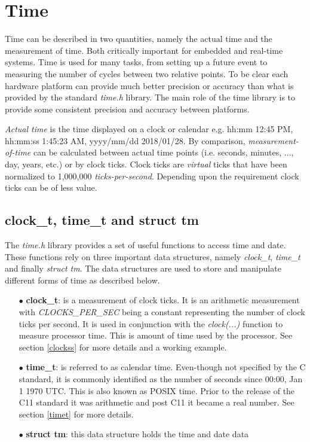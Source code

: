 \section{Time} \label{Time}

Time can be described in two quantities, namely the actual time and the measurement of time. Both critically important for embedded and real-time systems. Time is used for many tasks, from setting up a future event to measuring the number of cycles between two relative points. To be clear each hardware platform can provide much better precision or accuracy than what is provided by the standard \textit{time.h} library. The main role of the time library is to provide some consistent precision and accuracy between platforms.  

\textit{Actual time} is the time displayed on a clock or calendar e.g. hh:mm 12:45 PM, hh:mm:ss 1:45:23 AM, yyyy/mm/dd 2018/01/28. By comparison, \textit{measurement-of-time} can be calculated between actual time points (i.e. seconds, minutes, ..., day, years, etc.) or by clock ticks. Clock ticks are \textit{virtual} ticks that have been normalized to 1,000,000 \textit{ticks-per-second}. Depending upon the requirement clock ticks can be of less value. 

\subsection{clock\_t, time\_t and struct tm}

The \textit{time.h} library provides a set of useful functions to access time and date. These functions rely on three important data structures, namely \textit{clock\_t}, \textit{time\_t} and finally \textit{struct tm}. The data structures are used to store and manipulate different forms of time as described below.

\begin{itemize}
  \item[$\bullet$] \textbf{clock\_t}: is a measurement of clock ticks. It is an arithmetic measurement with \textit{CLOCKS\_PER\_SEC} being a constant representing the number of clock ticks per second. It is used in conjunction with the \textit{clock(...)} function to measure processor time. This is amount of time used by the processor. See section \ref{clockss} for more details and a working example.
  \item[$\bullet$] \textbf{time\_t}: is referred to as calendar time. Even-though not specified by the C standard, it is commonly identified as the number of seconds since 00:00, Jan 1 1970 UTC. This is also known as POSIX time. Prior to the release of the C11 standard it was arithmetic and post C11 it became a real number. See section \ref{timet} for more details. 
  \item[$\bullet$] \textbf{struct tm}: this data structure holds the time and date data
\end{itemize}

